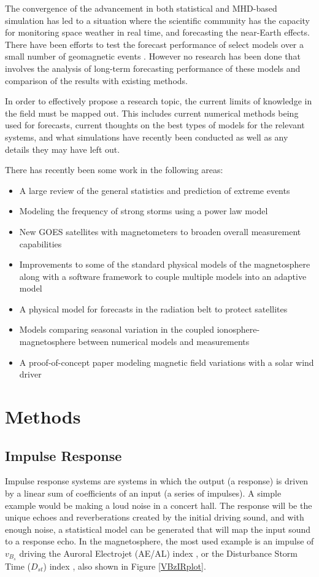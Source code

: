 \documentclass[10pt]{article}
\begin{document}
The convergence of the advancement in both statistical and MHD-based simulation has led to a situation where the scientific community has the capacity for monitoring space weather in real time, and forecasting the near-Earth effects.  There have been efforts to test the forecast performance of select models over a small number of geomagnetic events \citep{ANNforecast,StormModel,StatCompStorms,Yermolaev}. However no research has been done that involves the analysis of long-term forecasting performance of these models and comparison of the results with existing methods.

In order to effectively propose a research topic, the current limits of knowledge in the field must be mapped out. This includes current numerical methods being used for forecasts, current thoughts on the best types of models for the relevant systems, and what simulations have recently been conducted as well as any details they may have left out.

There has recently been some work in the following areas:
\begin{itemize} 
\item A large review of the general statistics and prediction of extreme events \citep{ExtremeEvents}
\item Modeling the frequency of strong storms using a power law model \citep{PowerLaw}
\item New GOES satellites with magnetometers to broaden overall measurement capabilities \citep{NewGOES}
\item Improvements to some of the standard physical models of the magnetosphere along with a software framework to couple multiple models into an adaptive model \citep{SWMF}
\item A physical model for forecasts in the radiation belt to protect satellites \citep{RadBeltForecast}
\item Models comparing seasonal variation in the coupled ionosphere-magnetosphere between numerical models and measurements \citep{Seasons}
\item A proof-of-concept paper modeling magnetic field variations with a solar wind driver \citep{DOYvar}
\end{itemize}


\section{Methods}
\subsection{Impulse Response}
Impulse response systems are systems in which the output (a response) is driven by a linear sum of coefficients of an input (a series of impulses). A simple example would be making a loud noise in a concert hall. The response will be the unique echoes and reverberations created by the initial driving sound, and with enough noise, a statistical model can be generated that will map the input sound to a response echo. In the magnetosphere, the most used example is an impulse of $v_{B_s}$ driving the Auroral Electrojet (AE/AL) index \citep{VBzAL}, or the Disturbance Storm Time ($D_{st}$) index \citep{VBzDST}, also shown in Figure \ref{VBzIRplot}.
\end{document}
